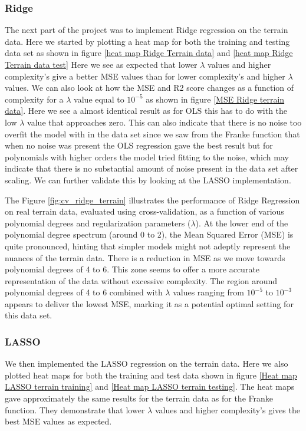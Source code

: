 \subsubsection{Ridge}
\noindent The next part of the project was to implement Ridge regression on the terrain data. Here we started by plotting a heat map for both the training and testing data set as shown in figure \eqref{heat map Ridge Terrain data} and \eqref{heat map Ridge Terrain data test} Here we see as expected that lower $\lambda$ values and higher complexity's give a better MSE values than for lower complexity's and higher $\lambda$ values. We can also look at how the MSE and R2 score changes as a function of complexity for a $\lambda$ value equal to $10^{-5}$ as shown in figure \eqref{MSE Ridge terrain data}. Here we see a almost identical result as for OLS this has to do with the low $\lambda$ value that approaches zero. This can also indicate that there is no noise too overfit the model with in the data set since we saw from the Franke function that when no noise was present the OLS regression gave the best result but for polynomials with higher orders the model tried fitting to the noise, which may indicate that there is no substantial amount of noise present in the data set after scaling. We can further validate this by looking at the LASSO implementation. 

\noindent The Figure \eqref{fig:cv_ridge_terrain} illustrates the performance of Ridge Regression on real terrain data, evaluated using cross-validation, as a function of various polynomial degrees and regularization parameters ($\lambda$). At the lower end of the polynomial degree spectrum (around 0 to 2), the Mean Squared Error (MSE) is quite pronounced, hinting that simpler models might not adeptly represent the nuances of the terrain data.
There is a reduction in MSE as we move towards polynomial degrees of 4 to 6. This zone seems to offer a more accurate representation of the data without excessive complexity. The region around polynomial degrees of 4 to 6 combined with $\lambda$ values ranging from $10^{-5}$ to $10^{-3}$ appears to deliver the lowest MSE, marking it as a potential optimal setting for this data set.

\subsubsection{LASSO}
\noindent We then implemented the LASSO regression on the terrain data. Here we also plotted heat maps for both the training and test data shown in figure \eqref{Heat map LASSO terrain training} and \eqref{Heat map LASSO terrain testing}. The heat maps gave approximately the same results for the terrain data as for the Franke function. They demonstrate that lower $\lambda$ values and higher complexity's gives the best MSE values as expected. 

